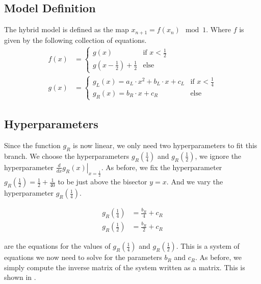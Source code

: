 \subsection{Model Definition}
\label{sec:setup.quad.hybrid.definition}

The hybrid model is defined as the map $x_{n+1} = f(x_n) \mod 1$.
Where $f$ is given by the following collection of equations.
\begin{align}
	f(x) & = \begin{cases}
		         g(x)                             & \text{if } x < \frac{1}{2} \\
		         g(x - \frac{1}{2}) + \frac{1}{2} & \text{else}
	         \end{cases} \label{equ:quad.full.f}           \\
	g(x) & = \begin{cases}
		         g_L(x) = a_L \cdot x^2 + b_L \cdot x + c_L & \text{if } x < \frac{1}{4} \\
		         g_R(x) = b_R \cdot x + c_R                 & \text{else}
	         \end{cases} \label{equ:quad.full.g}
\end{align}

\subsection{Hyperparameters}
\label{sec:setup.quad.hybrid.parameters}

Since the function $g_R$ is now linear, we only need two hyperparameters to fit this branch.
We choose the hyperparameters $g_R\left(\frac{1}{4}\right)$ and $g_R\left(\frac{1}{2}\right)$, we ignore the hyperparameter $\left. \frac{d}{dx} g_R(x) \right|_{x = \frac{1}{2}}$.
As before, we fix the hyperparameter $g_R\left(\frac{1}{2}\right) = \frac{1}{2} + \frac{1}{40}$ to be just above the bisector $y = x$.
And we vary the hyperparameter $g_R\left(\frac{1}{4}\right)$.

\begin{subequations}
	\begin{align}
		g_R\left(\frac{1}{4}\right) & = \frac{b_R}{4} + c_R \label{equ:setup.quad.hybrid.A} \\
		g_R\left(\frac{1}{2}\right) & = \frac{b_R}{2} + c_R \label{equ:setup.quad.hybrid.B}
	\end{align}
\end{subequations}

 are the equations for the values of $g_R\left(\frac{1}{4}\right)$ and $g_R\left(\frac{1}{2}\right)$.
This is a system of equations we now need to solve for the parameters $b_R$ and $c_R$.
As before, we simply compute the inverse matrix of the system written as a matrix.
This is shown in .

